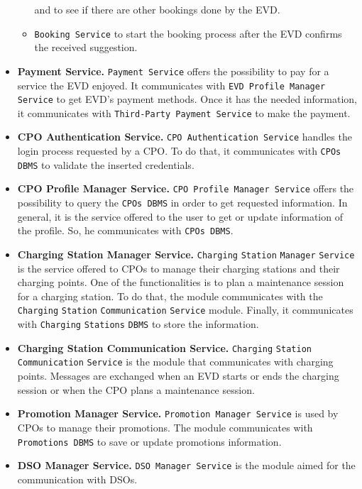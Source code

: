 \begin{itemize}
\begin{itemize}
        and to see if there are other bookings done by the EVD\@.
        \item \verb|Booking Service| to start the booking process after the EVD confirms the received suggestion.
    \end{itemize}
    \item \textbf{Payment Service.} \verb|Payment Service| offers the possibility to pay for a service the EVD enjoyed.
    It communicates with \verb|EVD Profile Manager Service| to get EVD's payment methods.
    Once it has the needed information, it communicates with \verb|Third-Party Payment Service| to make the payment.
    \item \textbf{CPO Authentication Service.} \verb|CPO Authentication Service| handles the login process requested by a CPO\@.
    To do that, it communicates with \verb|CPOs DBMS| to validate the inserted credentials.
    \item \textbf{CPO Profile Manager Service.} \verb|CPO Profile Manager Service| offers the possibility to query
    the \verb|CPOs DBMS| in order to get requested information.
    In general, it is the service offered to the user to get or update information of the profile.
    So, he communicates with \verb|CPOs DBMS|.
    \item \textbf{Charging Station Manager Service.} \verb|Charging| \verb|Station| \verb|Manager| \verb|Service| is the service offered to CPOs
    to manage their charging stations and their charging points.
    One of the functionalities is to plan a maintenance session for a charging station.
    To do that, the module communicates with the \verb|Charging| \verb|Station| \verb|Communication| \verb|Service| module.
    Finally, it communicates with \verb|Charging| \verb|Stations| \verb|DBMS| to store the information.
    \item \textbf{Charging Station Communication Service.} \verb|Charging| \verb|Station| \verb|Communication| \verb|Service| is the module
    that communicates with charging points.
    Messages are exchanged when an EVD starts or ends the charging session or when the CPO plans a maintenance session.
    \item \textbf{Promotion Manager Service.} \verb|Promotion Manager Service| is used by CPOs to manage their promotions.
    The module communicates with \verb|Promotions DBMS| to save or update promotions information.
    \item \textbf{DSO Manager Service.} \verb|DSO Manager Service| is the module aimed for the communication with DSOs.

\end{itemize}
